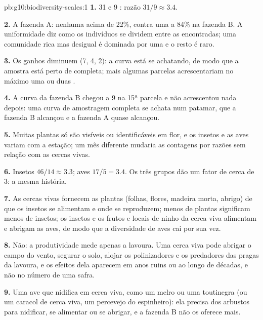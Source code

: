 \begin{solution}{pb:g10:biodiversity-scales:1}
\textbf{1.} 31 e 9 : razão $31/9 \approx 3.4$.

\textbf{2.} A fazenda A: nenhuma  acima de 22\%, contra uma a
84\% na fazenda B. A uniformidade diz como os indivíduos se dividem
entre as  encontradas; uma comunidade rica mas desigual é
dominada por uma  e o resto é raro.

\textbf{3.} Os ganhos diminuem (7, 4, 2): a curva está se achatando, de
modo que a amostra está perto de completa; mais algumas parcelas
acrescentariam no máximo uma ou duas .

\textbf{4.} A curva da fazenda B chegou a 9 na 15ª parcela e não
acrescentou nada depois: uma curva de amostragem completa se achata num
patamar, que a fazenda B alcançou e a fazenda A quase alcançou.

\textbf{5.} Muitas plantas só são visíveis ou identificáveis em flor, e
os insetos e as aves variam com a estação; um mês diferente mudaria as
contagens por razões sem relação com as cercas vivas.

\textbf{6.} Insetos $46/14 \approx 3.3$; aves $17/5 = 3.4$. Os três
grupos dão um fator de cerca de 3: a mesma história.

\textbf{7.} As cercas vivas fornecem as plantas (folhas, flores, madeira
morta, abrigo) de que os insetos se alimentam e onde se reproduzem;
menos  de plantas significam menos  de insetos; os
insetos e os frutos e locais de ninho da cerca viva alimentam e abrigam
as aves, de modo que a diversidade de aves cai por sua vez.

\textbf{8.} Não: a produtividade mede apenas a lavoura. Uma cerca viva
pode abrigar o campo do vento, segurar o solo, alojar os polinizadores e
os predadores das pragas da lavoura, e os efeitos dela aparecem em anos
ruins ou ao longo de décadas, e não no número de uma safra.

\textbf{9.} Uma ave que nidifica em cerca viva, como um melro ou uma
toutinegra (ou um caracol de cerca viva, um percevejo do espinheiro):
ela precisa dos arbustos para nidificar, se alimentar ou se abrigar, e
a fazenda B não os oferece mais.


\end{solution}

